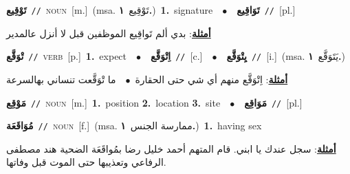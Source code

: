 \documentclass[10pt,a4paper,twoside]{article} %
\begin{document}
\begin{multicols}{2}
{\setlength\topsep{0pt}\textbf{\foreignlanguage{arabic}{تَوْقِيع}}\ {\color{gray}\texttt{//}\color{black}}\ \textsc{noun}\ [m.]\ \color{gray}(msa. \foreignlanguage{arabic}{تَوْقِيع}~\foreignlanguage{arabic}{\textbf{١.}})\color{black}\ \textbf{1.}~signature\ \ $\bullet$\ \ \setlength\topsep{0pt}\textbf{\foreignlanguage{arabic}{تَوَاقِيع}}\ {\color{gray}\texttt{//}\color{black}}\ [pl.]\  \begin{flushright}\color{gray}\foreignlanguage{arabic}{\textbf{\underline{\foreignlanguage{arabic}{أمثلة}}}: بدي ألم تَواقِيع الموظفين قبل لا أنزل عالمدير}\end{flushright}\color{black}} \vspace{2mm}

{\setlength\topsep{0pt}\textbf{\foreignlanguage{arabic}{تْوَقَّع}}\ {\color{gray}\texttt{//}\color{black}}\ \textsc{verb}\ [p.]\ \textbf{1.}~expect\ \ $\bullet$\ \ \setlength\topsep{0pt}\textbf{\foreignlanguage{arabic}{اِتْوَقَّع}}\ {\color{gray}\texttt{//}\color{black}}\ [c.]\ \ $\bullet$\ \ \setlength\topsep{0pt}\textbf{\foreignlanguage{arabic}{يِتْوَقَّع}}\ {\color{gray}\texttt{//}\color{black}}\ [i.]\ \color{gray}(msa. \foreignlanguage{arabic}{يَتَوَقَّع}~\foreignlanguage{arabic}{\textbf{١.}})\color{black}\  \begin{flushright}\color{gray}\foreignlanguage{arabic}{\textbf{\underline{\foreignlanguage{arabic}{أمثلة}}}: اِتْوَقَّع منهم أي شي حتى الحقارة\ $\bullet$\ \  ما تْوَقَّعت تنساني بهالسرعة}\end{flushright}\color{black}} \vspace{2mm}

{\setlength\topsep{0pt}\textbf{\foreignlanguage{arabic}{مَوْقِع}}\ {\color{gray}\texttt{//}\color{black}}\ \textsc{noun}\ [m.]\ \textbf{1.}~position  \textbf{2.}~location  \textbf{3.}~site\ \ $\bullet$\ \ \setlength\topsep{0pt}\textbf{\foreignlanguage{arabic}{مَوَاقِع}}\ {\color{gray}\texttt{//}\color{black}}\ [pl.]\ } \vspace{2mm}

{\setlength\topsep{0pt}\textbf{\foreignlanguage{arabic}{مُوَاقَعَة}}\ {\color{gray}\texttt{//}\color{black}}\ \textsc{noun}\ [f.]\ \color{gray}(msa. \foreignlanguage{arabic}{ممارسة الجنس}~\foreignlanguage{arabic}{\textbf{١.}})\color{black}\ \textbf{1.}~having sex\  \begin{flushright}\color{gray}\foreignlanguage{arabic}{\textbf{\underline{\foreignlanguage{arabic}{أمثلة}}}: سجل عندك يا ابني. قام المتهم أحمد خليل رضا بمُواقَعَة الضحية هند مصطفى الرفاعي وتعذيبها حتى الموت قبل وفاتها.}\end{flushright}\color{black}} \vspace{2mm}


\end{multicols}
\end{document}
